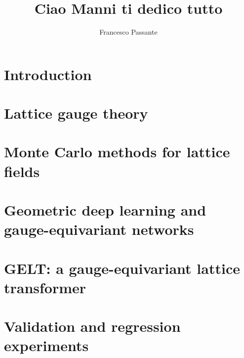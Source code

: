 \documentclass[noexaminfo]{sapthesis}
\title{Ciao Manni ti dedico tutto}
\author{Francesco Passante}
\begin{document}
\frontmatter
\maketitle


\begin{abstract}

\end{abstract}

% 

\tableofcontents

\mainmatter

\chapter{Introduction}
\label{ch:introduction}


\chapter{Lattice gauge theory}
\label{ch:lgt}


\chapter{Monte Carlo methods for lattice fields}
\label{ch:montecarlo}


\chapter{Geometric deep learning and gauge-equivariant networks}
\label{ch:gdl}


\chapter{GELT: a gauge-equivariant lattice transformer}
\label{ch:gelt}


\chapter{Validation and regression experiments}
\label{ch:regression}

\end{document}
